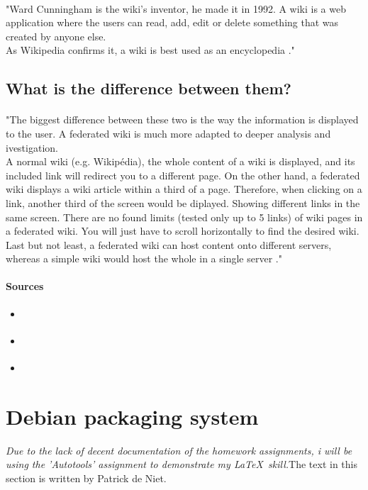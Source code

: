 \documentclass[10pt,a4paper]{article}
\begin{document}
\paragraph{}"Ward Cunningham is the wiki's inventor, he made it in 1992.
A wiki is a web application where the users can read, add, edit or delete something that was created by anyone else.\\
As Wikipedia confirms it, a wiki is best used as an encyclopedia \cite{floref3}."\cite{floref1}

\subsection{What is the difference between them?}
\paragraph{}"The biggest difference between these two is the way the information is displayed to the user. A federated wiki is much more adapted to deeper analysis and ivestigation.\\
A normal wiki (e.g. Wikipédia), the whole content of a wiki is displayed, and its included link will redirect you to a different page. On the other hand, a federated wiki displays a wiki article within a third of a page. Therefore, when clicking on a link, another third of the screen would be diplayed. Showing different links in the same screen. There are no found limits (tested only up to 5 links) of wiki pages in a federated wiki. You will just have to scroll horizontally to find the desired wiki.\\
Last but not least, a federated wiki can host content onto different servers, whereas a simple wiki would host the whole in a single server \cite{floref1}\cite{floref3}."\cite{floref1}

\paragraph{Sources}
\begin{itemize}
\item \cite{floref1}
\item \cite{floref2} 
\item \cite{floref3}
\end{itemize}


\newpage
\section{Debian packaging system}
\textit{Due to the lack of decent documentation of the homework assignments, i will be using the 'Autotools' assignment to demonstrate my \LaTeX\ \cite{patref1}skill.}The text in this section is written by Patrick de Niet.
\end{document}
